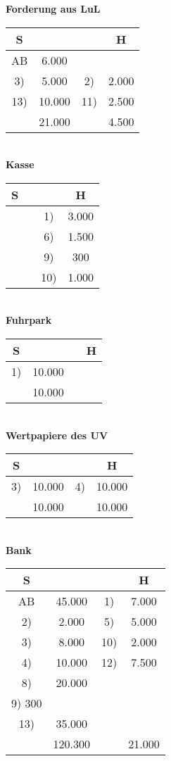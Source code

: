 \documentclass[paper=a4, fontsize=11pt]{scrartcl}
\numberwithin{equation}{section}
\numberwithin{figure}{section}
\numberwithin{table}{section}
\begin{document}
\textbf{Forderung aus LuL}
\begin{tabular}{cc|cc}
S & & & H \\\hline
AB & 6.000 & & \\
3) & 5.000 & 2) & 2.000 \\
13) & 10.000 & 11) & 2.500 \\\hline
  & 21.000 & & 4.500 \\\hline
\end{tabular} \\
\textbf{Kasse}
\begin{tabular}{cc|cc}
S & & & H \\\hline
  & & 1) & 3.000 \\
  & & 6) & 1.500 \\
  & & 9) & 300 \\
  & & 10) & 1.000 \\\hline
\end{tabular} \\
\textbf{Fuhrpark}
\begin{tabular}{cc|cc}
S & & & H \\\hline
1) & 10.000 & & \\\hline
  & 10.000 & & \\\hline
\end{tabular} \\
\textbf{Wertpapiere des UV}
\begin{tabular}{cc|cc}
S & & & H \\\hline
3) & 10.000 & 4) & 10.000 \\\hline
  & 10.000 & & 10.000 \\\hline
\end{tabular} \\
\textbf{Bank}
\begin{tabular}{cc|cc}
S & & & H \\\hline
AB & 45.000 & 1) & 7.000 \\
2) & 2.000 & 5) & 5.000 \\
3) & 8.000 & 10) & 2.000 \\
4) & 10.000 & 12) & 7.500 \\  
8) & 20.000 & & \\  
9)  300& & & \\  
13) & 35.000 & & \\\hline
  & 120.300 & & 21.000 \\\hline
\end{tabular} \\
\end{document}
